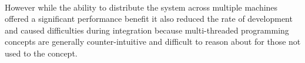 \paragraph{}
However while the ability to distribute the system across multiple machines offered a significant performance benefit it also reduced the rate of development and caused difficulties during integration because multi-threaded programming concepts are generally counter-intuitive and difficult to reason about for those not used to the concept.


